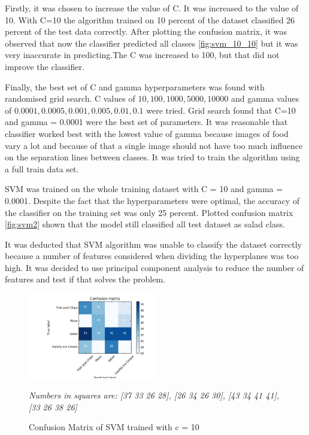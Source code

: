 Firstly, it was chosen to increase the value of C. It was increased to the value of 10. With C=10 the algorithm trained on 10 percent of the dataset classified 26 percent of the test data correctly. After plotting the confusion matrix, it was observed that now the classifier predicted all classes \autoref{fig:svm_10_10} but it was very inaccurate in predicting.The C was increased to 100, but that did not improve the classifier.

Finally, the best set of C and gamma hyperparameters was found with randomised grid search. C values of  \(10, 100, 1000, 5000, 10000\) and gamma values  of \(0.0001, 0.0005, 0.001, 0.005, 0.01, 0.1\) were tried. Grid search found that C=10 and gamma = 0.0001 were the best set of parameters. It was reasonable that classifier worked best with the lowest value of gamma because images of food vary a lot and because of that a single image should not have too much influence on the separation lines between classes. It was tried to train the algorithm using a full train data set.

SVM was trained on the whole training dataset with C = 10 and gamma = 0.0001. Despite the fact that the hyperparameters were optimal, the accuracy of the classifier on the training set was only 25 percent. Plotted confusion matrix \autoref{fig:svm2} shown that the model still classified all test dataset as salad class. 

It was deducted that SVM algorithm was unable to classify the dataset correctly because a number of features considered when dividing the hyperplanes was too high. It was decided to use principal component analysis to reduce the number of features and test if that solves the problem.


\begin{figure}[h]
\centering
\includegraphics[width=0.5\textwidth]{Figures/svm_10_10.jpg}
\caption{Confusion Matrix of SVM trained with c = 10}
 \textit{Numbers in squares are: [37 33 26 28],
 [26 34 26 30],
 [43 34 41 41],
 [33 26 38 26]}
\label{fig:svm_10_10}
\end{figure}

